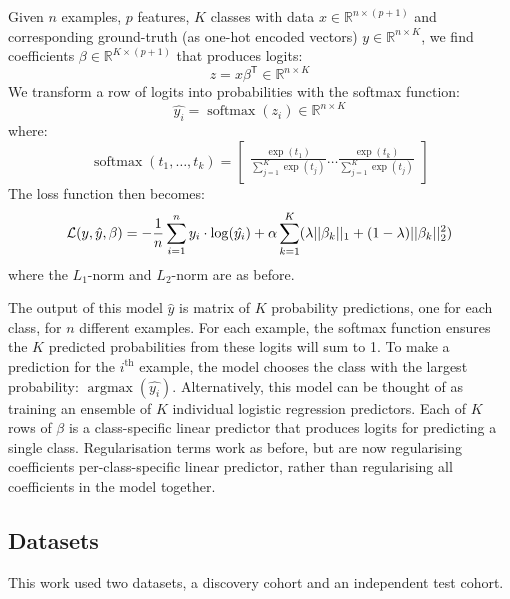 \documentclass{article} %
\DeclareMathOperator*{\argmax}{argmax}
\DeclareMathOperator*{\softmax}{softmax}
\newcommand{\equationname}[1]{%
    \begingroup
        \leavevmode
        \addcontentsline{equ}{equations}{\protect\numberline{\theequation}#1}%
    \endgroup   
}
\begin{document}
Given \(n\) examples, \(p\) features, \(K\) classes with data \(x \in \mathbb{R}^{n \times (p + 1)}\) and corresponding ground-truth (as one-hot encoded vectors) \(y \in \mathbb{R}^{n \times K}\), we find coefficients \(\beta \in \mathbb{R}^{K \times (p + 1)}\) that produces logits:
\[z = x \beta^\mathsf{T} \in \mathbb{R}^{n \times K}\]
We transform a row of logits into probabilities with the softmax function:
\[\hat{y_i} = \softmax(z_i) \in \mathbb{R}^{n \times K}\]
where:
\[\softmax(t_1,\hdots , t_k) =
    \begin{bmatrix}
        \frac{\exp(t_1)}{\sum_{j=1}^{K} \exp(t_j)}
        \hdots
        \frac{\exp(t_k)}{\sum_{j=1}^{K} \exp(t_j)}
    \end{bmatrix}
\]
The loss function then becomes:
\begin{equation} \equationname{Elastic Net logistic regression} \label{eqn:mc_log_elastic_net}
    \mathcal{L}(y, \hat{y}, \beta) = -\frac{1}{n}\sum_{i=1}^{n} y_i \cdot \log(\hat{y_i}) + \alpha\sum_{k=1}^{K}(\lambda||\beta_k||_1 + (1 - \lambda)||\beta_k||_2^2)
\end{equation}
where the \(L_1\)-norm and \(L_2\)-norm are as before.

The output of this model \(\hat{y}\) is matrix of \(K\) probability predictions, one for each class, for \(n\) different examples. For each example, the softmax function ensures the \(K\) predicted probabilities from these logits will sum to 1. To make a prediction for the \(i^\text{th}\) example, the model chooses the class with the largest probability: \(\argmax(\hat{y_i})\). Alternatively, this model can be thought of as training an ensemble of \(K\) individual logistic regression predictors. Each of \(K\) rows of \(\beta\) is a class-specific linear predictor that produces logits for predicting a single class. Regularisation terms work as before, but are now regularising coefficients per-class-specific linear predictor, rather than regularising all coefficients in the model together.

\subsection{Datasets}
This work used two datasets, a discovery cohort and an independent test cohort.
\end{document}
